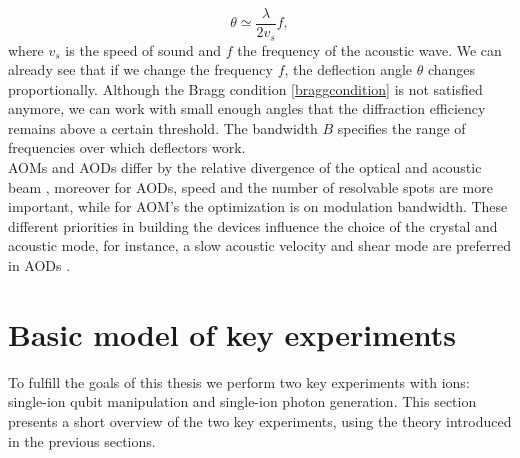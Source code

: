 \begin{equation}
\theta \simeq \frac{\lambda}{2 v_s}f,
\end{equation}
where $v_s$ is the speed of sound and $f$ the frequency of the acoustic wave. We can already see that if we change the frequency $f$, the deflection angle $\theta$ changes proportionally. Although the Bragg condition \eqref{braggcondition} is not satisfied anymore, we can work with small enough angles that the diffraction efficiency remains above a certain threshold. The bandwidth $B$ specifies the range of frequencies over which deflectors work.\\
AOMs and AODs differ by the relative divergence of the optical and acoustic beam \cite{handbookoptics}, moreover for AODs, speed and the number of resolvable spots are more important, while for AOM's the optimization is on modulation bandwidth. These different priorities in building the devices influence
the choice of the crystal and acoustic mode, for instance, a slow acoustic velocity and shear mode are preferred in AODs \cite{handbookoptics}.

\section{Basic model of key experiments}
To fulfill the goals of this thesis we perform two key experiments with ions: single-ion qubit manipulation and single-ion photon generation. This section presents a short overview of the two key experiments, using the theory introduced in the previous sections.

